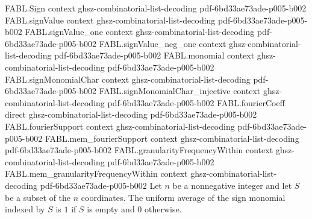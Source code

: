 \begin{theorem}
\label{FABL.expect_monomial}
\leanok
{}
\proofstep
  {FABL.Sign}
  {context}
  {ghsz-combinatorial-list-decoding}
  {pdf-6bd33ae73ade-p005-b002}
\proofstep
  {FABL.signValue}
  {context}
  {ghsz-combinatorial-list-decoding}
  {pdf-6bd33ae73ade-p005-b002}
\proofstep
  {FABL.signValue_one}
  {context}
  {ghsz-combinatorial-list-decoding}
  {pdf-6bd33ae73ade-p005-b002}
\proofstep
  {FABL.signValue_neg_one}
  {context}
  {ghsz-combinatorial-list-decoding}
  {pdf-6bd33ae73ade-p005-b002}
\proofstep
  {FABL.monomial}
  {context}
  {ghsz-combinatorial-list-decoding}
  {pdf-6bd33ae73ade-p005-b002}
\proofstep
  {FABL.signMonomialChar}
  {context}
  {ghsz-combinatorial-list-decoding}
  {pdf-6bd33ae73ade-p005-b002}
\proofstep
  {FABL.signMonomialChar_injective}
  {context}
  {ghsz-combinatorial-list-decoding}
  {pdf-6bd33ae73ade-p005-b002}
\proofstep
  {FABL.fourierCoeff}
  {direct}
  {ghsz-combinatorial-list-decoding}
  {pdf-6bd33ae73ade-p005-b002}
\proofstep
  {FABL.fourierSupport}
  {context}
  {ghsz-combinatorial-list-decoding}
  {pdf-6bd33ae73ade-p005-b002}
\proofstep
  {FABL.mem_fourierSupport}
  {context}
  {ghsz-combinatorial-list-decoding}
  {pdf-6bd33ae73ade-p005-b002}
\proofstep
  {FABL.granularityFrequencyWithin}
  {context}
  {ghsz-combinatorial-list-decoding}
  {pdf-6bd33ae73ade-p005-b002}
\proofstep
  {FABL.mem_granularityFrequencyWithin}
  {context}
  {ghsz-combinatorial-list-decoding}
  {pdf-6bd33ae73ade-p005-b002}
Let $n$ be a nonnegative integer and let $S$ be a subset of the $n$ coordinates. The
uniform average of the sign monomial indexed by $S$ is $1$ if $S$ is empty and $0$
otherwise.
\end{theorem}
